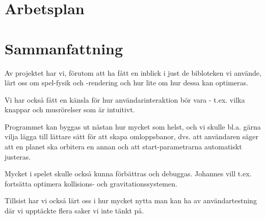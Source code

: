 \documentclass[a4paper, 11pt]{article}
\begin{document}
\subsection{}


\subsection{}


\subsection{}


\section{Arbetsplan}
\label{sec:arbplan}

\subsection{}


\subsection{}


\subsection{}


\section{Sammanfattning}

Av projektet har vi, förutom att ha fått en inblick i just de
bibloteken vi använde, lärt oss om spel-fysik och -rendering
och hur lite om hur dessa kan optimeras.

Vi har också fått en känsla för hur användarinteraktion bör
vara - t.ex. vilka knappar och musrörelser som är intuitivt.

Programmet kan byggas ut nästan hur mycket som helst,
och vi skulle bl.a. gärna vilja lägga till lättare sätt
för att skapa omloppsbanor, dvs. att användaren säger att
en planet ska orbitera en annan och att start-parametrarna
automatiskt justeras.

Mycket i spelet skulle också kunna förbättras och debuggas.
Johannes vill t.ex. fortsätta optimera kollisions- och gravitationssystemen.

Tillsist har vi också lärt oss i hur mycket nytta man
kan ha av användartestning där vi upptäckte flera saker vi inte tänkt på.
\end{document}
